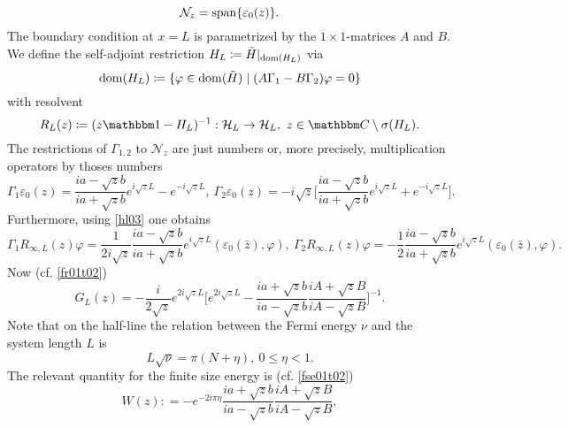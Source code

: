 \begin{equation}\label{hl06}
  \mathcal{N}_z = \operatorname{span}\{ \varepsilon_0(z) \} .
\end{equation}
The boundary condition at $x=L$ is parametrized by the $1\times 1$-matrices $A$ and $B$.
We define the self-adjoint restriction $H_L\coloneqq\tilde H|_{\operatorname{dom}(H_L)}$ via
\begin{equation}\label{hl07}
  \operatorname{dom}(H_L) \coloneqq \{ \varphi\in\operatorname{dom}(\tilde H) \mid (A\Gamma_1-B\Gamma_2)\varphi =0 \}
\end{equation}
with resolvent
\begin{equation}\label{hl08}
  R_L(z)\coloneqq (z\id- H_L)^{-1}:\hilbert_L\to\hilbert_L,\
  z\in\C\setminus\sigma(H_L) .
\end{equation}
The restrictions of $\Gamma_{1,2}$ to $\mathcal{N}_z$ are just numbers or, more precisely, multiplication operators by thoses numbers
\begin{equation}\label{hl09}
  \Gamma_1 \varepsilon_0(z) = \frac{ia-\sqrt{z}b}{ia+\sqrt{z}b} e^{i\sqrt{z}L} - e^{-i\sqrt{z}L},\
  \Gamma_2 \varepsilon_0(z) = -i\sqrt{z} \big[ \frac{ia-\sqrt{z}b}{ia+\sqrt{z}b} e^{i\sqrt{z}L} + e^{-i\sqrt{z}L} \big] .
\end{equation}
Furthermore, using \eqref{hl03} one obtains
\begin{equation}\label{hl10}
  \Gamma_1R_{\infty,L}(z)\varphi
    = \frac{1}{2i\sqrt{z}}\frac{ia-\sqrt{z}b}{ia+\sqrt{z}b} e^{i\sqrt{z}L} ( \varepsilon_0(\bar z),\varphi)
  ,\
  \Gamma_2R_{\infty,L}(z)\varphi = -\frac{1}{2}\frac{ia-\sqrt{z}b}{ia+\sqrt{z}b} e^{i\sqrt{z}L} (\varepsilon_0(\bar z),\varphi) .
\end{equation}
Now (cf. \eqref{fr01t02})
\begin{equation}\label{hl11}
  G_L(z) = - \frac{i}{2\sqrt{z}}e^{2i\sqrt{z}L}
    \big[ e^{2i\sqrt{z}L} - \frac{ia+\sqrt{z}b}{ia-\sqrt{z}b}\frac{iA+\sqrt{z}B}{iA-\sqrt{z}B} \big]^{-1} .
\end{equation}
Note that on the half-line the relation between the Fermi energy $\nu$ and the system length $L$ is
\begin{equation*}
  L \sqrt{\nu} = \pi( N+\eta ), \ 0\leq \eta < 1 .
\end{equation*}
The relevant quantity for the finite size energy is (cf. \eqref{fse01t02})
\begin{equation}\label{hl12}
  W(z) : = - e^{-2i\pi\eta}\frac{ia+\sqrt{z}b}{ia-\sqrt{z}b}\frac{iA+\sqrt{z}B}{iA-\sqrt{z}B} ,
\end{equation}
